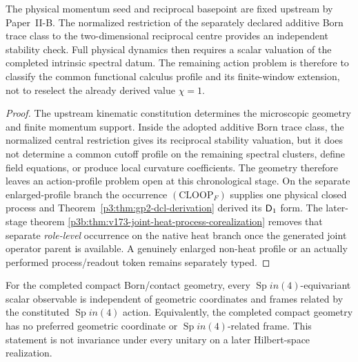 \documentclass[12pt,a4paper]{article}
\begin{document}
\begin{theorem}
\label{p3:thm:scalar-valuation-necessity}
The physical momentum seed and reciprocal basepoint are fixed upstream by Paper~II-B.
The normalized restriction of the separately declared additive Born trace
class to the two-dimensional reciprocal centre provides an independent
stability check.
Full physical dynamics then requires a scalar valuation of the completed
intrinsic spectral datum.  The
remaining action problem is therefore to classify the common functional
calculus profile and its finite-window extension, not to reselect the already
derived value \(\chi=1\).
\end{theorem}

\begin{proof}
The upstream kinematic constitution determines the microscopic geometry and finite momentum support.  Inside the adopted
additive Born trace class, the normalized central restriction gives its
reciprocal stability valuation, but it does not determine a common cutoff
profile on the remaining spectral clusters, define field equations, or
produce local curvature coefficients.  The geometry therefore leaves an
action-profile problem open at this chronological stage.  On the separate enlarged-profile branch the
occurrence \((\mathrm{CLOOP}_F)\) supplies one physical closed process and
Theorem~\ref{p3:thm:gp2-dcl-derivation} derived its \(\mathsf{D}_1\) form.  The
later-stage theorem
\ref{p3b:thm:v173-joint-heat-process-corealization} removes that separate
\emph{role-level} occurrence on the native heat branch once the generated
joint operator parent is available.  A genuinely enlarged non-heat profile or
an actually performed process/readout token remains separately typed.
\end{proof}

\begin{theorem}
\label{p3:thm:spectral_covariance}
\leavevmode\par\noindent
For the completed compact Born/contact geometry, every \(\operatorname{Sp}in(4)\)-equivariant
scalar observable is independent of geometric coordinates and frames related
by the constituted \(\operatorname{Sp}in(4)\) action.  Equivalently, the completed compact
geometry has no preferred geometric coordinate or \(\operatorname{Sp}in(4)\)-related frame.
This statement is not invariance under every unitary on a later Hilbert-space
realization.
\end{theorem}
\end{document}
